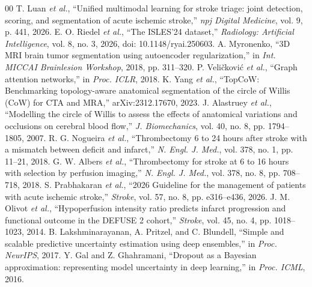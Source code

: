 \documentclass[conference]{IEEEtran}
\begin{document}
\begin{thebibliography}{00}
 T. Luan \emph{et al.}, ``Unified multimodal learning for stroke triage: joint detection, scoring, and segmentation of acute ischemic stroke,'' \emph{npj Digital Medicine}, vol. 9, p. 441, 2026.
 E. O. Riedel \emph{et al.}, ``The ISLES'24 dataset,'' \emph{Radiology: Artificial Intelligence}, vol. 8, no. 3, 2026, doi: 10.1148/ryai.250603.
 A. Myronenko, ``3D MRI brain tumor segmentation using autoencoder regularization,'' in \emph{Int. MICCAI Brainlesion Workshop}, 2018, pp. 311--320.
 P. Veli\v{c}kovi\'{c} \emph{et al.}, ``Graph attention networks,'' in \emph{Proc. ICLR}, 2018.
 K. Yang \emph{et al.}, ``TopCoW: Benchmarking topology-aware anatomical segmentation of the circle of Willis (CoW) for CTA and MRA,'' arXiv:2312.17670, 2023.
 J. Alastruey \emph{et al.}, ``Modelling the circle of Willis to assess the effects of anatomical variations and occlusions on cerebral blood flow,'' \emph{J. Biomechanics}, vol. 40, no. 8, pp. 1794--1805, 2007.
 R. G. Nogueira \emph{et al.}, ``Thrombectomy 6 to 24 hours after stroke with a mismatch between deficit and infarct,'' \emph{N. Engl. J. Med.}, vol. 378, no. 1, pp. 11--21, 2018.
 G. W. Albers \emph{et al.}, ``Thrombectomy for stroke at 6 to 16 hours with selection by perfusion imaging,'' \emph{N. Engl. J. Med.}, vol. 378, no. 8, pp. 708--718, 2018.
 S. Prabhakaran \emph{et al.}, ``2026 Guideline for the management of patients with acute ischemic stroke,'' \emph{Stroke}, vol. 57, no. 8, pp. e316--e436, 2026.
 J. M. Olivot \emph{et al.}, ``Hypoperfusion intensity ratio predicts infarct progression and functional outcome in the DEFUSE 2 cohort,'' \emph{Stroke}, vol. 45, no. 4, pp. 1018--1023, 2014.
 B. Lakshminarayanan, A. Pritzel, and C. Blundell, ``Simple and scalable predictive uncertainty estimation using deep ensembles,'' in \emph{Proc. NeurIPS}, 2017.
 Y. Gal and Z. Ghahramani, ``Dropout as a Bayesian approximation: representing model uncertainty in deep learning,'' in \emph{Proc. ICML}, 2016.
\end{thebibliography}
\end{document}
